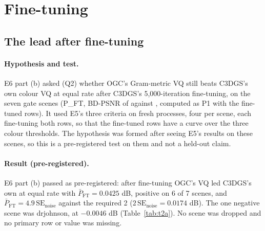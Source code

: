 \section{Fine-tuning}
\label{sec:finetuning}

\subsection{The lead after fine-tuning}
\label{sec:ft-result}

\paragraph{Hypothesis and test.}
E6 part (b) asked (Q2) whether OGC's Gram-metric VQ still beats C3DGS's own colour VQ at equal rate after C3DGS's 5,000-iteration fine-tuning, on the seven gate scenes (P\_FT, BD-PSNR of  against , computed as P1 with the fine-tuned rows). %
It used E5's three criteria on fresh processes, four per scene, each fine-tuning both rows, so that the fine-tuned rows have a curve over the three colour thresholds. %
The hypothesis was formed after seeing E5's results on these scenes, so this is a pre-registered test on them and not a held-out claim. %

\paragraph{Result (pre-registered).}
E6 part (b) passed as pre-registered: after fine-tuning OGC's VQ led C3DGS's own at equal rate with $\bar P_{\mathrm{FT}} = 0.0425$ dB, positive on 6 of 7 scenes, and $\bar P_{\mathrm{FT}} = 4.9\,\mathrm{SE}_{\mathrm{noise}}$ against the required 2 ($2\,\mathrm{SE}_{\mathrm{noise}} = 0.0174$ dB). %
The one negative scene was drjohnson, at $-0.0046$ dB (Table~\ref{tab:t2a}). %
No scene was dropped and no primary row or value was missing. %

\begin{table}[t]
\centering
\footnotesize
\setlength{\tabcolsep}{4pt}
\caption{E6 part (b) per scene (dB). P\_FT is the pre-registered primary (9 decimals, as compared). $D_{s0}$ and $D_{s1}$ are the fine-tuned pair's protocol~ii difference at $j = 0$ with seeds 0 and 1, $D_s$ their mean and $v_s$ their sum of squared deviations. P1 replicated is a report-only secondary beside E5's P1. Generated from the committed bundles.}
\label{tab:t2a}

\end{table}

